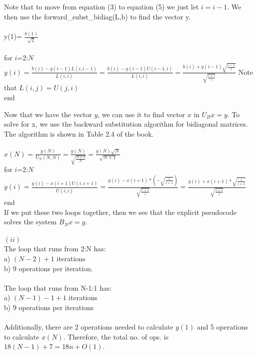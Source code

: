 \documentclass{article}
\begin{document}
Note that to move from equation (3) to equation (5) we just let \(i=i-1\).
We then use the forward\_subst\_bidiag(L,b) to find the vector y.\\\\
\indent y(1)= \(\frac{b(1)}{\sqrt{2}}\) \\\\
\indent for \(i\)=2:\(N\) \\
\indent \hspace{1 cm} \(y(i)= \frac{b(i)-y(i-1)L(i,i-1)}{L(i,i)} = \frac{b(i)-y(i-1)U(i-1,i)}{L(i,i)} = \frac{b(i)+y(i-1) \sqrt{\frac{i-1}{i}}}{\sqrt{\frac{i+i}{i}}}\) \indent Note that \(L(i,j)=U(j,i)\)\\ 
\indent end \\
\par Now that we have the vector \(y\), we can use it to find vector \(x\) in \(U_Bx=y\). To solve for x, we use the backward substitution algorithm for bidiagonal matrices. The algorithm is shown in Table 2.4 of the book.\\\\
\indent \( x(N)=\frac{y(N)}{U_N(N,N)} = \frac{y(N)}{\sqrt{\frac{N+1}{N}}} = \frac{y(N)\sqrt{N}}{\sqrt{N+1}} \)\\
\indent for \(i\)=2:\(N\) \\
\indent \hspace{1 cm} \(y(i) = \frac{y(i)-x(i+1)U(i,i+1)}{U(i,i)} = \frac{y(i)-x(i+1)*(-\sqrt{\frac{i}{i+1}})}{\sqrt{\frac{i+1}{i}}} = \frac{y(i)+x(i+1)*\sqrt{\frac{i}{i+1}}}{\sqrt{\frac{i+1}{i}}}\) \\
\indent end \\
If we put these two loops together, then we see that the explicit pseudocode solves the system \(B_Nx=y\).\\\\
\((ii)\) \\
The loop that runs from 2:N has:\\
\indent a) \((N-2)+1\) iterations\\ 
\indent b) 9 operations per iteration.\\\\
The loop that runs from N-1:1 has:\\
\indent a) \((N-1)-1+1\) iterations\\
\indent b) 9 operations per iterations\\\\
Additionally, there are 2 operations needed to calculate \(y(1)\) and 5 operations to calculate \(x(N)\). Therefore, the total no. of ops. is \(18(N-1) + 7 = 18n +O(1)\).\\
\end{document}
